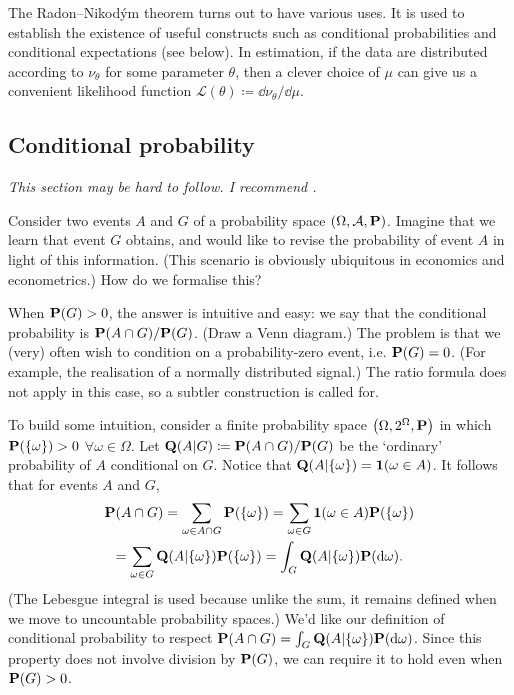 \documentclass[11pt,letterpaper,reqno,oneside]{article}
\begin{document}
The Radon--Nikod\'{y}m theorem turns out to have various uses. It is used to establish the existence of useful constructs such as conditional probabilities and conditional expectations (see below). In estimation, if the data are distributed according to $\nu_\theta$ for some parameter $\theta$, then a clever choice of $\mu$ can give us a convenient likelihood function $\mathcal{L}(\theta) \coloneqq \dd \nu_\theta / \dd \mu$.



\subsection{Conditional probability}
\label{sec:probability:conditional_probability}

\emph{This section may be hard to follow. I recommend \textcite[][sec. 33]{Billingsley1995}.}

Consider two events $A$ and $G$ of a probability space $(\Omega,\mathcal{A},\mathbf{P})$. Imagine that we learn that event $G$ obtains, and would like to revise the probability of event $A$ in light of this information. (This scenario is obviously ubiquitous in economics and econometrics.) How do we formalise this?

When $\mathbf{P}(G)>0$, the answer is intuitive and easy: we say that the conditional probability is $\mathbf{P}(A \cap G) / \mathbf{P}(G)$. (Draw a Venn diagram.) The problem is that we (very) often wish to condition on a probability-zero event, i.e. $\mathbf{P}(G)=0$. (For example, the realisation of a normally distributed signal.) The ratio formula does not apply in this case, so a subtler construction is called for.

To build some intuition, consider a finite probability space $\left(\Omega,2^\Omega,\mathbf{P}\right)$ in which $\mathbf{P}(\{\omega\})>0$ $\forall \omega \in \Omega$. Let $\mathbf{Q}(A|G) \coloneqq \mathbf{P}(A \cap G) / \mathbf{P}(G)$ be the `ordinary' probability of $A$ conditional on $G$. Notice that $\mathbf{Q}(A|\{\omega\}) = \boldsymbol{1}( \omega \in A )$. It follows that for events $A$ and $G$,
%
\begin{multline*}
	\mathbf{P}(A \cap G)
	= \sum_{\omega \in A \cap G} \mathbf{P}(\{\omega\})
	= \sum_{\omega \in G} \boldsymbol{1}( \omega \in A ) \mathbf{P}(\{\omega\})
	\\
	= \sum_{\omega \in G} \mathbf{Q}( A | \{\omega\} ) \mathbf{P}(\{\omega\}) 
	= \int_G \mathbf{Q}( A | \{\omega\} ) \mathbf{P}(\mathrm{d}\omega) .
\end{multline*}
%
(The Lebesgue integral is used because unlike the sum, it remains defined when we move to uncountable probability spaces.) We'd like our definition of conditional probability to respect $\mathbf{P}(A \cap G) = \int_G \mathbf{Q}( A | \{\omega\} ) \mathbf{P}(\mathrm{d}\omega)$. Since this property does not involve division by $\mathbf{P}(G)$, we can require it to hold even when $\mathbf{P}(G)>0$.
\end{document}
